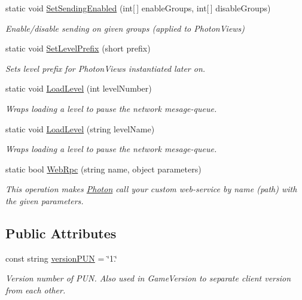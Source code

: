 \begin{DoxyCompactItemize}
static void \hyperlink{class_photon_network_a208a46eaefe19c965eb62d18ca59ac41}{Set\+Sending\+Enabled} (int\mbox{[}$\,$\mbox{]} enable\+Groups, int\mbox{[}$\,$\mbox{]} disable\+Groups)
\begin{DoxyCompactList}\small\item\em Enable/disable sending on given groups (applied to Photon\+Views) \end{DoxyCompactList}\item 
static void \hyperlink{class_photon_network_a6b98294843798e6ebac72704a867b6da}{Set\+Level\+Prefix} (short prefix)
\begin{DoxyCompactList}\small\item\em Sets level prefix for Photon\+Views instantiated later on. \end{DoxyCompactList}\item 
static void \hyperlink{class_photon_network_a5bb203a37b6db717583ea7b81fb56852}{Load\+Level} (int level\+Number)
\begin{DoxyCompactList}\small\item\em Wraps loading a level to pause the network mesage-\/queue. \end{DoxyCompactList}\item 
static void \hyperlink{class_photon_network_aaa7a2114de2a80a0a2ded65d1c0079ba}{Load\+Level} (string level\+Name)
\begin{DoxyCompactList}\small\item\em Wraps loading a level to pause the network mesage-\/queue. \end{DoxyCompactList}\item 
static bool \hyperlink{class_photon_network_ad9a866c73b3e417d55266ed548a52cb8}{Web\+Rpc} (string name, object parameters)
\begin{DoxyCompactList}\small\item\em This operation makes \hyperlink{namespace_photon}{Photon} call your custom web-\/service by name (path) with the given parameters. \end{DoxyCompactList}\end{DoxyCompactItemize}
\subsection*{Public Attributes}
\begin{DoxyCompactItemize}
\item 
const string \hyperlink{class_photon_network_ac6b98cecd29a9ced8ec4a6ae78908dfc}{version\+P\+UN} = \char`\"{}1.\char`\"{}
\begin{DoxyCompactList}\small\item\em Version number of P\+UN. Also used in Game\+Version to separate client version from each other.\end{DoxyCompactList}\end{DoxyCompactItemize}
